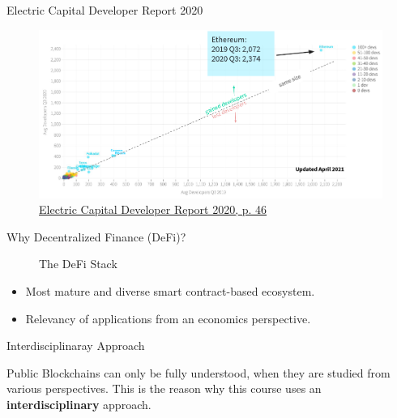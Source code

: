 \documentclass[handout]{beamer}
\begin{document}
\begin{frame}{Electric Capital Developer Report 2020}
	
	\begin{figure}
		\includegraphics[width=\textwidth]{../assets/images/electric_capital}
		
		\caption{\footnotesize  \href{https://github.com/electric-capital/developer-reports}{\link Electric Capital Developer Report 2020, p. 46} \cite{EC20}} 
	\end{figure}


\end{frame}


\begin{frame}{Why Decentralized Finance (DeFi)?}

\begin{figure}[t]
	\centering	
	\resizebox{0.8\textwidth}{!}{
	\begin{tikzpicture}[scale=1.0, every node/.style={scale=1.0}]
			
	\end{tikzpicture}}
	\caption{The DeFi Stack \cite{FS:21}}
\end{figure}

\vspace{-1.0em}

\begin{itemize}
	\item Most mature and diverse smart contract-based ecosystem.
	\item Relevancy of applications from an economics perspective.
\end{itemize}

\end{frame}

\begin{frame}{Interdisciplinaray Approach}

	\vspace{1em}
Public Blockchains can only be fully understood, when they are studied from various perspectives. This is the reason why this course uses an \color{focus} \textbf{interdisciplinary} \color{black} approach.	


\end{frame}
\end{document}

